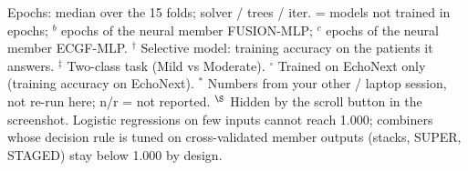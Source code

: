 \documentclass[12pt,border=10pt]{standalone}
\begin{document}
\begin{minipage}{15.0cm}
\vspace{4pt}
{\footnotesize Epochs: median over the 15 folds; solver / trees / iter. = models not trained in epochs; $^{b}$ epochs of the neural member FUSION-MLP; $^{c}$ epochs of the neural member ECGF-MLP. $^{\dagger}$ Selective model: training accuracy on the patients it answers. $^{\ddagger}$ Two-class task (Mild vs Moderate). $^{\circ}$ Trained on EchoNext only (training accuracy on EchoNext). $^{*}$ Numbers from your other / laptop session, not re-run here; n/r = not reported. $^{\S}$ Hidden by the scroll button in the screenshot. Logistic regressions on few inputs cannot reach 1.000; combiners whose decision rule is tuned on cross-validated member outputs (stacks, SUPER, STAGED) stay below 1.000 by design.\par}
\end{minipage}
\end{document}
